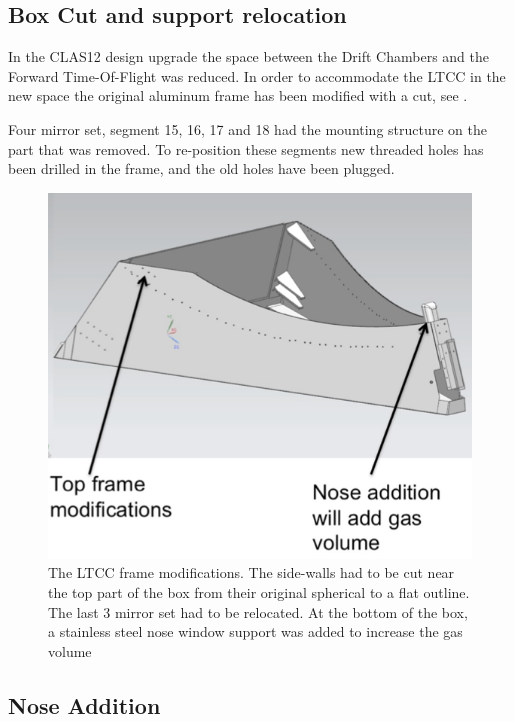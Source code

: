 \subsection{Box Cut and support relocation }

In the CLAS12 design upgrade the space between the Drift Chambers and the Forward Time-Of-Flight was reduced.
In order to accommodate the LTCC in the new space the original aluminum frame has been modified with a cut, see .

Four mirror set, segment 15, 16, 17 and 18 had the mounting structure on the part that was removed.
To re-position these segments new threaded holes has been drilled in the frame, and the old holes have been plugged.

\begin{figure}
	\centering
	\includegraphics[width=1.0\columnwidth,keepaspectratio]{img/boxCut.png}
	\caption{The LTCC frame modifications. The side-walls had to be cut near the top part of the box from their original
            spherical to a flat outline. The last 3 mirror set had to be relocated. At the bottom of the box, a stainless steel
            nose window support was added to increase the gas volume}
	\label{fig:boxCut}
\end{figure}


\subsection{Nose Addition}

